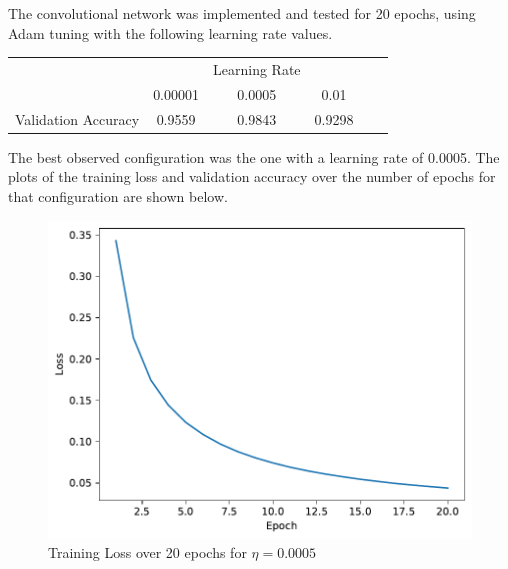 \begin{questions}
        \question
            The convolutional network was implemented and tested for 20 epochs, using Adam tuning with the following learning rate values.
            
            \begin{table}[h!]
                \centering
                \begin{tabular}{c|ccccc}
                    &                                     & Learning Rate                      &                 &  &  \\ \cline{2-4}
                    & \multicolumn{1}{c|}{0.00001}          & \multicolumn{1}{c|}{0.0005}          & 0.01             &  &  \\ \cline{1-4}
                    Validation Accuracy & \multicolumn{1}{c|}{0.9559} & \multicolumn{1}{c|}{0.9843} & 0.9298 &  & 
                \end{tabular}
            \end{table}
        
            The best observed configuration was the one with a learning rate of 0.0005.
            The plots of the training loss and validation accuracy over the number of epochs for that configuration are shown below.
    
            \begin{figure}[H]
                \centering
                \includegraphics[scale=0.6]{CNN-training-loss-0.0005-0.3-0-adam.pdf}
                \caption{Training Loss over 20 epochs for $\eta = 0.0005$}
                \label{}
            \end{figure}
    

\end{questions}
